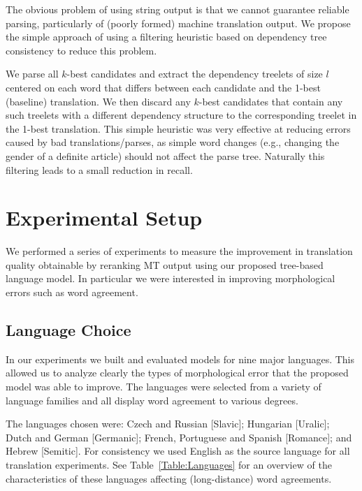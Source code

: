 \documentclass[english]{jnlp_1.4}
\begin{document}
The obvious problem of using string output is that we cannot guarantee reliable parsing,
particularly of (poorly formed) machine translation output. We propose the
simple approach of using a filtering heuristic based on dependency tree consistency
to reduce this problem.

We parse all $k$-best candidates and extract the dependency treelets
of size $l$ centered on each word that differs between each candidate and the 1-best (baseline)
translation. We then discard any $k$-best candidates that contain any such treelets
with a different dependency structure to the corresponding treelet in the 1-best translation.
This simple heuristic was very effective at reducing errors caused by bad translations/parses,
as simple word changes (e.g., changing the gender of a definite article)
should not affect the parse tree. Naturally this filtering leads to a small reduction in recall.


\section{Experimental Setup}
\label{Section:Experiments}

We performed a series of experiments to measure the improvement in translation quality
obtainable by reranking MT output using our proposed tree-based language model.
In particular we were interested in improving morphological errors such as word agreement.


\subsection{Language Choice}

In our experiments we built and evaluated models for nine major languages. This allowed
us to analyze clearly the types of morphological error that the proposed model
was able to improve. The languages were selected from a variety
of language families and all display word agreement to various degrees.

The languages chosen were: Czech and Russian [Slavic];
Hungarian [Uralic]; Dutch and German [Germanic]; French, Portuguese and Spanish
[Romance]; and Hebrew [Semitic]. For consistency we used English as the source
language for all translation experiments. See Table~\ref{Table:Languages} for an overview
of the characteristics of these languages affecting (long-distance) word agreements.

\begin{table}[t]
\label{Table:Languages}

\end{table}
\end{document}
